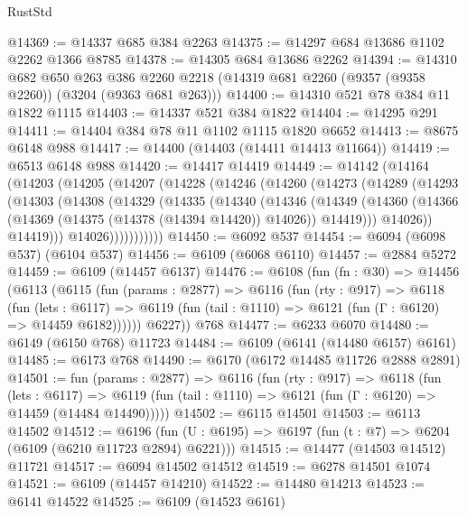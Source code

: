 \begin{lexlean}{RustStd}
\begin{coremodule}
@14369 := @14337 @685 @384 @2263
@14375 := @14297 @684 @13686 @1102 @2262 @1366 @8785
@14378 := @14305 @684 @13686 @2262
@14394 := @14310
    @682
    @650
    @263
    @386
    @2260
    @2218
    (@14319 @681 @2260 (@9357 (@9358 @2260)) (@3204 (@9363 @681 @263)))
@14400 := @14310 @521 @78 @384 @11 @1822 @1115
@14403 := @14337 @521 @384 @1822
@14404 := @14295 @291
@14411 := @14404 @384 @78 @11 @1102 @1115 @1820 @6652
@14413 := @8675 @6148 @988
@14417 := @14400 (@14403 (@14411 @14413 @11664))
@14419 := @6513 @6148 @988
@14420 := @14417 @14419
@14449 := @14142
    (@14164
      (@14203
        (@14205
          (@14207
            (@14228
              (@14246
                (@14260
                  (@14273
                    (@14289
                      (@14293
                        (@14303
                          (@14308
                            (@14329
                              (@14335
                                (@14340
                                  (@14346
                                    (@14349
                                      (@14360
                                        (@14366
                                          (@14369 (@14375 (@14378 (@14394 @14420)) @14026))
                                          @14419)))
                                    @14026))
                                @14419)))
                          @14026)))))))))))
@14450 := @6092 @537
@14454 := @6094 (@6098 @537) (@6104 @537)
@14456 := @6109 (@6068 @6110)
@14457 := @2884 @5272
@14459 := @6109 (@14457 @6137)
@14476 := @6108
    (fun (fn : @30) =>
    @14456
      (@6113
        (@6115
          (fun (params : @2877) =>
          @6116
            (fun (rty : @917) =>
            @6118
              (fun (lets : @6117) =>
              @6119 (fun (tail : @1110) => @6121 (fun (Γ : @6120) => @14459 @6182))))))
        @6227))
    @768
@14477 := @6233 @6070
@14480 := @6149 (@6150 @768) @11723
@14484 := @6109 (@6141 (@14480 @6157) @6161)
@14485 := @6173 @768
@14490 := @6170 (@6172 @14485 @11726 @2888 @2891)
@14501 := fun (params : @2877) =>
  @6116
    (fun (rty : @917) =>
    @6118
      (fun (lets : @6117) =>
      @6119 (fun (tail : @1110) => @6121 (fun (Γ : @6120) => @14459 (@14484 @14490)))))
@14502 := @6115 @14501
@14503 := @6113 @14502
@14512 := @6196
    (fun (U : @6195) => @6197 (fun (t : @7) => @6204 (@6109 (@6210 @11723 @2894) @6221)))
@14515 := @14477 (@14503 @14512) @11721
@14517 := @6094 @14502 @14512
@14519 := @6278 @14501 @1074
@14521 := @6109 (@14457 @14210)
@14522 := @14480 @14213
@14523 := @6141 @14522
@14525 := @6109 (@14523 @6161)

\end{coremodule}
\end{lexlean}
